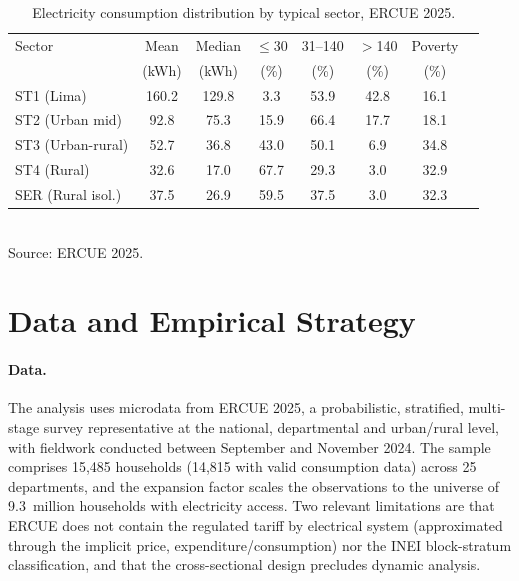 \documentclass[11pt,a4paper]{article}
\begin{document}
\begin{table}[t]
\centering
\small
\caption{Electricity consumption distribution by typical sector, ERCUE 2025.}
\label{tab:sector}
\begin{tabular}{lccccccc}
\toprule
Sector & Mean & Median & $\leq$30 & 31--140 & $>$140 & Poverty \\
 & (kWh) & (kWh) & (\%) & (\%) & (\%) & (\%) \\
\midrule
ST1 (Lima)        & 160.2 & 129.8 & 3.3  & 53.9 & 42.8 & 16.1 \\
ST2 (Urban mid)   & 92.8  & 75.3  & 15.9 & 66.4 & 17.7 & 18.1 \\
ST3 (Urban-rural) & 52.7  & 36.8  & 43.0 & 50.1 & 6.9  & 34.8 \\
ST4 (Rural)       & 32.6  & 17.0  & 67.7 & 29.3 & 3.0  & 32.9 \\
SER (Rural isol.) & 37.5  & 26.9  & 59.5 & 37.5 & 3.0  & 32.3 \\
\bottomrule
\end{tabular}
\\[2pt]
\footnotesize Source: ERCUE 2025.
\end{table}

\section{Data and Empirical Strategy}

\paragraph{Data.} The analysis uses microdata from ERCUE 2025, a probabilistic,
stratified, multi-stage survey representative at the national, departmental and
urban/rural level, with fieldwork conducted between September and November
2024. The sample comprises 15{,}485 households (14{,}815 with valid
consumption data) across 25 departments, and the expansion factor scales the
observations to the universe of 9.3~million households with electricity
access. Two relevant limitations are that ERCUE does not contain the regulated
tariff by electrical system (approximated through the implicit price,
expenditure/consumption) nor the INEI block-stratum classification, and that
the cross-sectional design precludes dynamic analysis.
\end{document}
